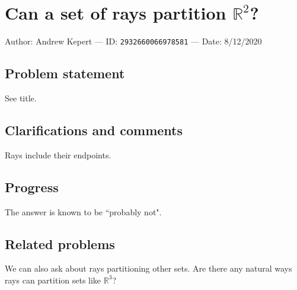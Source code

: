 
\section{Can a set of rays partition $\mathbb{R}^2$?}

Author: Andrew Kepert --- ID: \verb`2932660066978581` --- Date: 8/12/2020

\subsection{Problem statement}

See title.

\subsection{Clarifications and comments}

Rays include their endpoints.

\subsection{Progress}

The answer is known to be ``probably not".

\subsection{Related problems}

We can also ask about rays partitioning other sets. Are there any natural ways rays can partition sets like $\mathbb{R}^3$?

